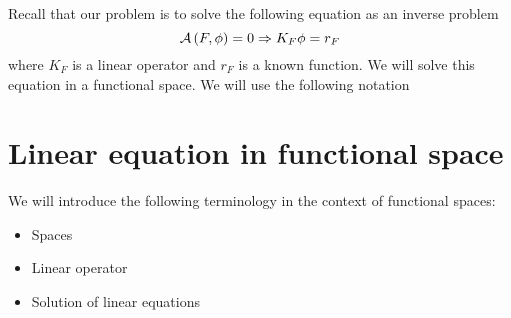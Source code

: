 Recall that our problem is to solve the following equation as an inverse problem
\begin{equation*}
    \mathcal{A}\left(F,\phi\right)=0 \Rightarrow K_F\phi=r_F
\end{equation*}
where $K_F$ is a linear operator and $r_F$ is a known function. We will solve this equation in a functional space. We will use the following notation
\section{Linear equation in functional space}
We will introduce the following terminology in the context of functional spaces:
\begin{itemize}
    \item Spaces
    \item Linear operator
    \item Solution of linear equations
\end{itemize}
